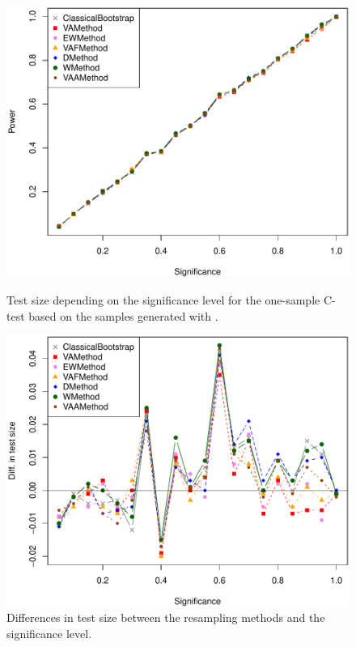 \begin{figure}[htbp]
  \centering
	\begin{minipage}[b]{0.45\linewidth}
	\includegraphics[scale=0.4]{size_plot_1_v2.pdf}
	\caption{Test size depending on the significance level for the one-sample C-test  based on the samples generated with .}
	\label{fig1size}
	\end{minipage}  
\quad 
\begin{minipage}[b]{0.45\linewidth}
	\includegraphics[scale=0.4]{size_plot_2_v2.pdf}
	\caption{Differences in test size between the resampling methods and the significance level.}
	\label{fig2size}
	\end{minipage}  
\end{figure}

